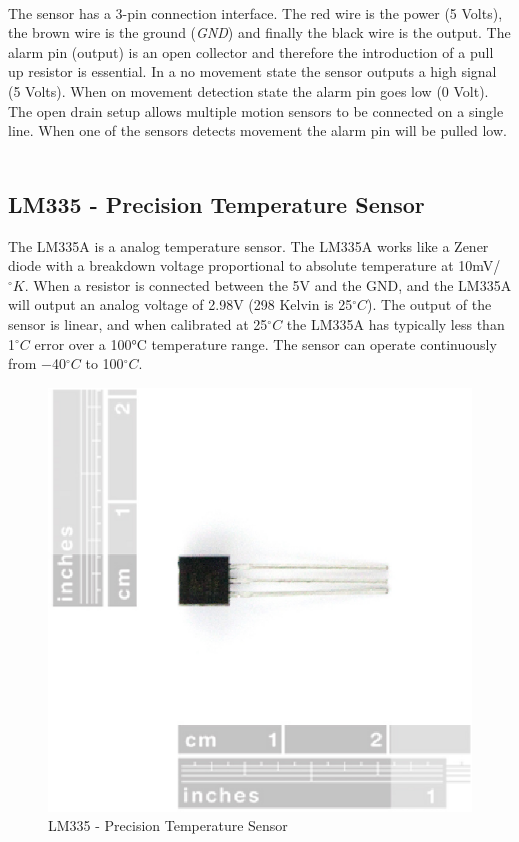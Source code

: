 \documentclass[12pt,a4paper,draft]{report}
\begin{document}
\ \\
The sensor has a 3-pin connection interface. The red wire is the power (5 Volts), the brown wire is the ground (\textit{GND}) and finally the black wire is the output. The alarm pin (output) is an open collector and therefore the introduction of a pull up resistor is essential. In a  no movement state the sensor outputs a high signal (5 Volts). When on movement detection state the alarm pin goes low (0 Volt). The open drain setup allows multiple motion sensors to be connected on a single line. When one of the sensors detects movement the alarm pin will be pulled low.
\ \\
%
\subsection{LM335 - Precision Temperature Sensor}
%
The LM335A is a analog temperature sensor. The LM335A works like a Zener diode with a breakdown voltage proportional to absolute temperature at 10mV/$^\circ K$. When a resistor is connected between the 5V and the GND, and the LM335A will output an analog voltage of 2.98V (298 Kelvin is 25$^\circ C$).  The output of the sensor is linear, and when calibrated at 25$^\circ C$ the LM335A has typically less than 1$^\circ C$ error over a 100°C temperature range. The sensor can operate continuously from −40$^\circ C$ to 100$^\circ C$. 
\ \\
\begin{figure}[H]
\centering
\includegraphics*[scale=0.3]{lm335}
\caption{LM335 - Precision Temperature Sensor}
\end{figure}
\ \\
%
\end{document}

